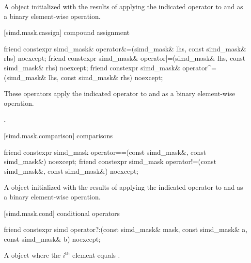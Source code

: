 \begin{itemdescr}
  \pnum\returns
  A  object initialized with the results of applying the indicated operator to  and  as a binary element-wise operation.
\end{itemdescr}

[simd.mask.cassign]{\texorpdfstring{ compound}{simd_mask compound} assignment}

\begin{itemdecl}
friend constexpr simd_mask& operator&=(simd_mask& lhs, const simd_mask& rhs) noexcept;
friend constexpr simd_mask& operator|=(simd_mask& lhs, const simd_mask& rhs) noexcept;
friend constexpr simd_mask& operator^=(simd_mask& lhs, const simd_mask& rhs) noexcept;
\end{itemdecl}

\begin{itemdescr}
  \pnum\effects
  These operators apply the indicated operator to  and  as a binary element-wise operation.

  \pnum\returns
  .
\end{itemdescr}

[simd.mask.comparison]{\texorpdfstring{ comparisons}{simd_mask comparisons}}

\begin{itemdecl}
friend constexpr simd_mask operator==(const simd_mask&, const simd_mask&) noexcept;
friend constexpr simd_mask operator!=(const simd_mask&, const simd_mask&) noexcept;
\end{itemdecl}

\begin{itemdescr}
  \pnum\returns
  A  object initialized with the results of applying the indicated operator to  and  as a binary element-wise operation.
\end{itemdescr}

[simd.mask.cond]{\texorpdfstring{}{simd_mask} conditional operators}

\begin{itemdecl}
friend constexpr simd operator?:(const simd_mask& mask, const simd_mask& a, const simd_mask& b) noexcept;
\end{itemdecl}

\begin{itemdescr}
  \pnum\returns
  A  object where the $i^\text{th}$ element equals  \foralli.
\end{itemdescr}

